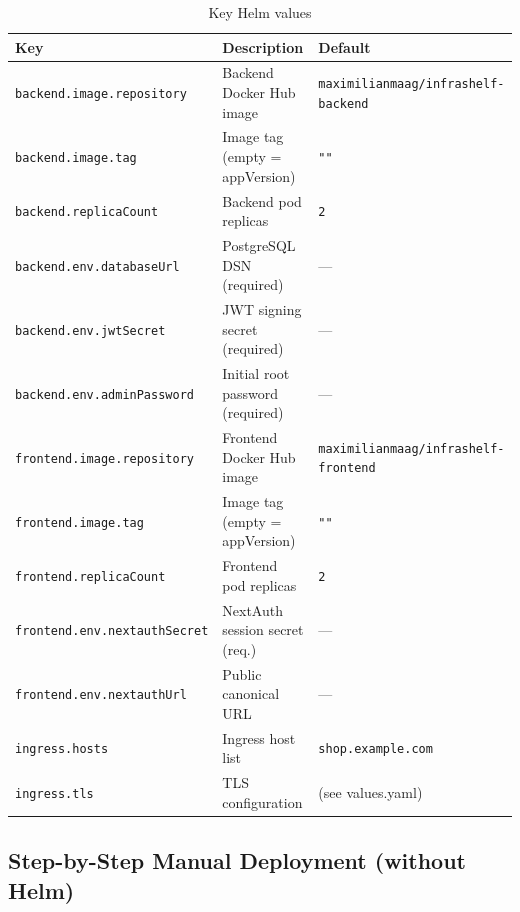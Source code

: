 \documentclass[12pt,a4paper,twoside]{report}
\newcommand{\code}[1]{\texttt{#1}}
\begin{document}
\begin{table}[H]
  \centering
  \caption{Key Helm values}
  \label{tab:helm-values}
  \begin{tabularx}{\linewidth}{@{}l>{\raggedright\arraybackslash}Xl@{}}
    \toprule
    \textbf{Key} & \textbf{Description} & \textbf{Default} \\
    \midrule
    \code{backend.image.repository}       & Backend Docker Hub image          & \code{maximilianmaag/infrashelf-backend} \\
    \code{backend.image.tag}              & Image tag (empty = appVersion)    & \code{""} \\
    \code{backend.replicaCount}           & Backend pod replicas              & \code{2} \\
    \code{backend.env.databaseUrl}        & PostgreSQL DSN (required)         & — \\
    \code{backend.env.jwtSecret}          & JWT signing secret (required)     & — \\
    \code{backend.env.adminPassword}      & Initial root password (required)  & — \\
    \code{frontend.image.repository}      & Frontend Docker Hub image         & \code{maximilianmaag/infrashelf-frontend} \\
    \code{frontend.image.tag}             & Image tag (empty = appVersion)    & \code{""} \\
    \code{frontend.replicaCount}          & Frontend pod replicas             & \code{2} \\
    \code{frontend.env.nextauthSecret}    & NextAuth session secret (req.)    & — \\
    \code{frontend.env.nextauthUrl}       & Public canonical URL              & — \\
    \code{ingress.hosts}                  & Ingress host list                 & \code{shop.example.com} \\
    \code{ingress.tls}                    & TLS configuration                 & (see values.yaml) \\
    \bottomrule
  \end{tabularx}
\end{table}

\subsection*{Step-by-Step Manual Deployment (without Helm)}
\end{document}
